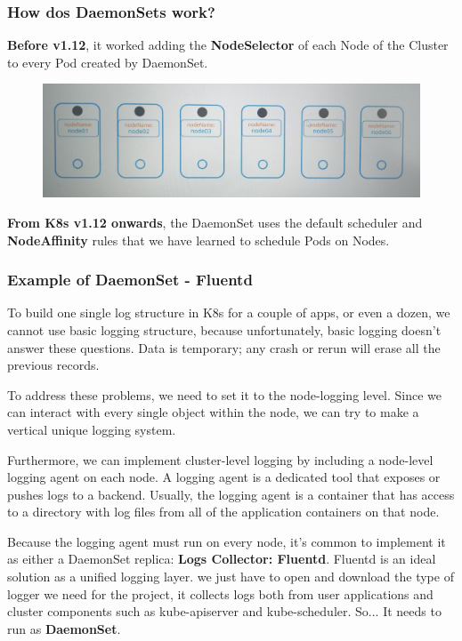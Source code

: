 \documentclass{article}
\begin{document}
\subsubsection{How dos DaemonSets work?}

\textbf{Before v1.12}, it worked adding the \textbf{NodeSelector} of each Node of the Cluster to every Pod created by DaemonSet. 

\begin{figure}[H]
    \includegraphics[width=\textwidth]{pictures/ds1.png}
\end{figure}


\textbf{From K8s v1.12 onwards}, the DaemonSet uses the default scheduler and \textbf{NodeAffinity} rules that we have learned to schedule Pods on Nodes.

\subsubsection{Example of DaemonSet - Fluentd}
To build one single log structure in K8s for a couple of apps, or even a dozen, we cannot use basic logging structure, because unfortunately, basic logging doesn’t answer these questions. Data is temporary; any crash or rerun will erase all the previous records.

To address these problems, we need to set it to the node-logging level. Since we can interact with every single object within the node, we can try to make a vertical unique logging system. 

Furthermore, we can implement cluster-level logging by including a node-level logging agent on each node. A logging agent is a dedicated tool that exposes or pushes logs to a backend. Usually, the logging agent is a container that has access to a directory with log files from all of the application containers on that node.

Because the logging agent must run on every node, it’s common to implement it as either a DaemonSet replica: \textbf{Logs Collector: Fluentd}. Fluentd is an ideal solution as a unified logging layer. we just have to open and download the type of logger we need for the project, 
it collects logs both from user applications and cluster components such as kube-apiserver and kube-scheduler. So... It needs to run as \textbf{DaemonSet}.
\end{document}
